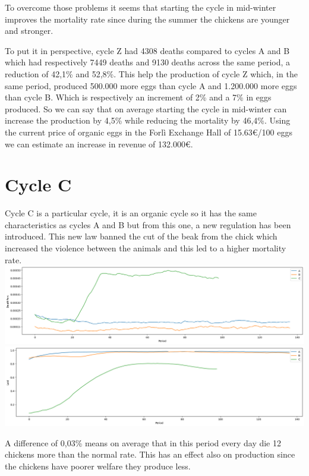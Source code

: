 \documentclass[11pt]{article}
\begin{document}
To overcome those problems it seems that starting the cycle in mid-winter improves the mortality rate since during the summer the chickens are younger and stronger.

To put it in perspective, cycle Z had 4308 deaths compared to cycles A and B which had respectively 7449 deaths and 9130 deaths across the same period, a reduction of 42,1\% and 52,8\%.
This help the production of cycle Z which, in the same period, produced 500.000 more eggs than cycle A and 1.200.000 more eggs than cycle B. Which is respectively an increment of 2\% and a 7\% in eggs produced.
So we can say that on average starting the cycle in mid-winter can increase the production by 4,5\% while reducing the mortality by 46,4\%.
Using the current price of organic eggs in the Forlì Exchange Hall of 15.63\euro/100 eggs we can estimate an increase in revenue of 132.000\euro.

\section{Cycle C}
Cycle C is a particular cycle, it is an organic cycle so it has the same characteristics as cycles A and B but from this one, a new regulation has been introduced. This new law banned the cut of the beak from the chick which increased the violence between the animals and this led to a higher mortality rate.\\
\includegraphics[width=\linewidth]{../Results/Comp_AB_C/Death.png}
\includegraphics[width=\linewidth]{../Results/Comp_AB_C/Laid.png}

A difference of 0,03\% means on average that in this period every day die 12 chickens more than the normal rate.
This has an effect also on production since the chickens have poorer welfare they produce less.
\end{document}
